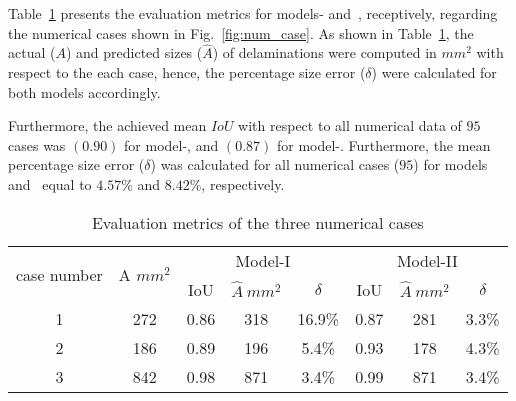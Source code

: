 Table~\ref{tab:num_cases} presents the evaluation metrics for models- and~, receptively, regarding the numerical cases shown in Fig.~\ref{fig:num_case}.
As shown in Table~\ref{tab:num_cases}, the actual (\(A\)) and predicted sizes (\(\hat{A}\)) of delaminations were computed in \(mm^2\) with respect to the each case, hence, the percentage size error (\(\delta\)) were calculated for both models accordingly.

Furthermore, the achieved mean \(IoU\) with respect to all numerical data of \(95\) cases was \((0.90)\) for model-, and \((0.87)\) for model-. 
Furthermore, the mean percentage size error (\(\delta\)) was calculated for all numerical cases (\(95\)) for models~ and~ equal to \(4.57 \%\) and \(8.42\%\), respectively.
\begin{table}[]
	\caption{Evaluation metrics of the three numerical cases}
	\begin{tabular}{cccccccc}
		\toprule
		\multirow{2}{*}{case number} & \multicolumn{1}{c}{\multirow{2}{*}{A \(mm^2\)}} & \multicolumn{3}{c}{Model-I}         & \multicolumn{3}{c}{Model-II} \\ 
		\cmidrule(lr){3-5} \cmidrule(lr){6-8} 
		& \multicolumn{1}{c}{}  & \multicolumn{1}{c}{IoU}  & \multicolumn{1}{c}{\(\hat{A}\ mm^2\)} & \(\delta\) & \multicolumn{1}{c}{IoU}  & \multicolumn{1}{c}{\(\hat{A}\ mm^2\)} & \(\delta\) \\ 
		\midrule
		1 & 272 & \multicolumn{1}{c}{0.86} & \multicolumn{1}{c}{318} & 16.9\% & \multicolumn{1}{c}{0.87} & \multicolumn{1}{c}{281} & 3.3\% \\ 
		2 &  186  & \multicolumn{1}{c}{0.89} & \multicolumn{1}{c}{196} & 5.4\% & \multicolumn{1}{c}{0.93} & \multicolumn{1}{c}{178} & 4.3\% \\ 
		3 & 842 & \multicolumn{1}{c}{0.98} &\multicolumn{1}{c}{871} & 3.4\%   & \multicolumn{1}{c}{0.99} & \multicolumn{1}{c}{871} & 3.4\% \\ 
		\bottomrule
	\end{tabular}	
	\label{tab:num_cases}
\end{table}
